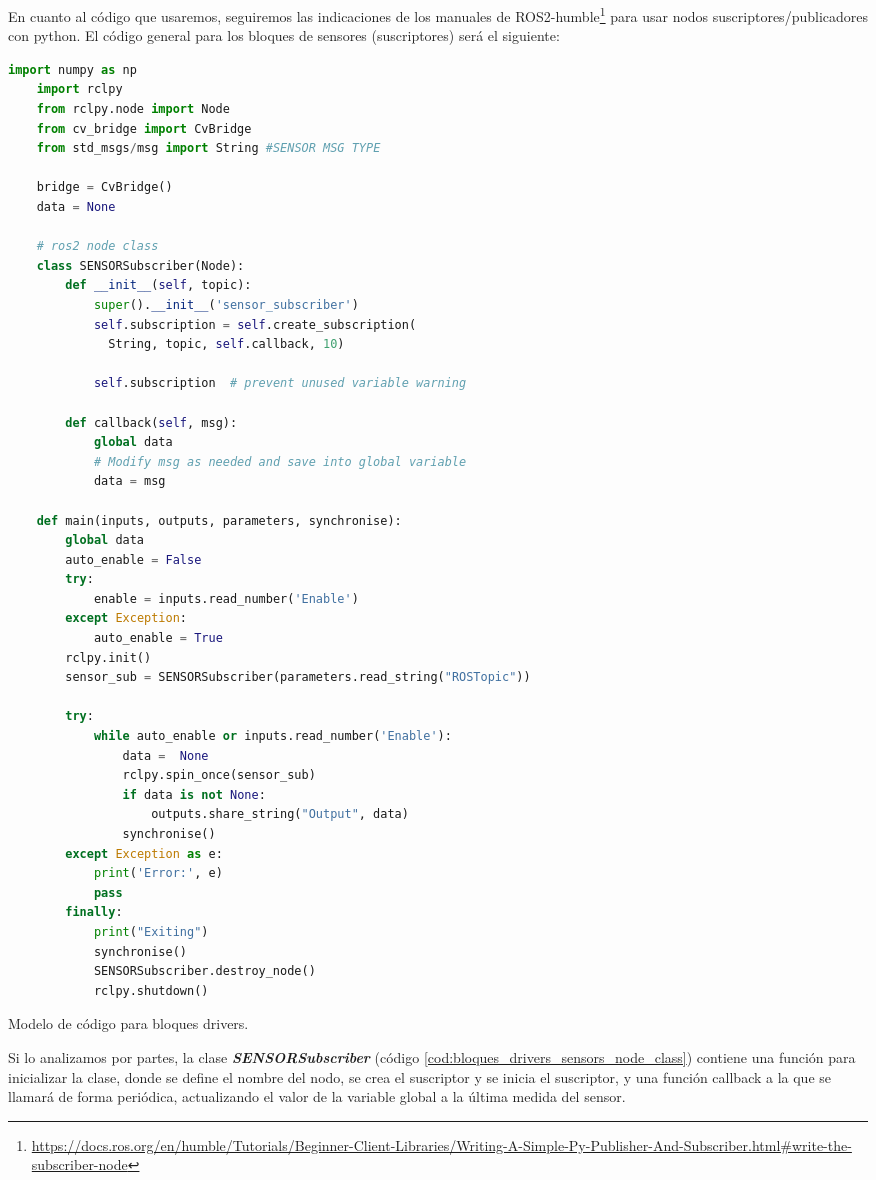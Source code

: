 En cuanto al código que usaremos, seguiremos las indicaciones de los manuales de
ROS2-humble\footnote{\url{https://docs.ros.org/en/humble/Tutorials/Beginner-Client-Libraries/Writing-A-Simple-Py-Publisher-And-Subscriber.html\#write-the-subscriber-node}}
para usar nodos suscriptores/publicadores con python. El código general para los bloques de sensores (suscriptores) será el siguiente:

\begin{code}[H]
  \begin{lstlisting}[language=python]
    import numpy as np
    import rclpy
    from rclpy.node import Node
    from cv_bridge import CvBridge
    from std_msgs/msg import String #SENSOR MSG TYPE
    
    bridge = CvBridge()
    data = None
    
    # ros2 node class
    class SENSORSubscriber(Node):
        def __init__(self, topic):
            super().__init__('sensor_subscriber')
            self.subscription = self.create_subscription(
              String, topic, self.callback, 10)

            self.subscription  # prevent unused variable warning
    
        def callback(self, msg):
            global data
            # Modify msg as needed and save into global variable
            data = msg

    def main(inputs, outputs, parameters, synchronise):
        global data
        auto_enable = False
        try:
            enable = inputs.read_number('Enable')
        except Exception:
            auto_enable = True
        rclpy.init()
        sensor_sub = SENSORSubscriber(parameters.read_string("ROSTopic"))

        try:
            while auto_enable or inputs.read_number('Enable'):
                data =  None
                rclpy.spin_once(sensor_sub)
                if data is not None:
                    outputs.share_string("Output", data)
                synchronise()
        except Exception as e:
            print('Error:', e)
            pass
        finally:
            print("Exiting")
            synchronise()     
            SENSORSubscriber.destroy_node()
            rclpy.shutdown()
  \end{lstlisting}
  \caption[Modelo de código para bloques drivers]{Modelo de código para bloques drivers.}
  \label{cod:bloques_drivers_sensors_total}
\end{code}

Si lo analizamos por partes, la clase \textbf{\textit{SENSORSubscriber}} (código \ref{cod:bloques_drivers_sensors_node_class}) contiene una función
para inicializar la clase, donde se define el nombre del nodo, se crea el suscriptor y se inicia el suscriptor, y una función callback a la que se
llamará de forma periódica, actualizando el valor de la variable global a la última medida del sensor.

